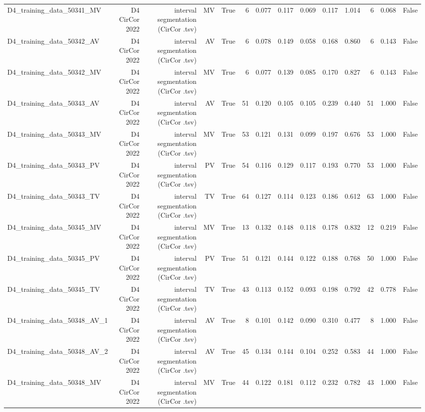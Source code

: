 \begin{table}[htbp]
\begin{tabular}{lrrrrrrrrrrrrr}
    D4\_training\_data\_50341\_MV & D4 CirCor 2022 & interval segmentation (CirCor .tsv) & MV & True & 6 & 0.077 & 0.117 & 0.069 & 0.117 & 1.014 & 6 & 0.068 & False \\
    D4\_training\_data\_50342\_AV & D4 CirCor 2022 & interval segmentation (CirCor .tsv) & AV & True & 6 & 0.078 & 0.149 & 0.058 & 0.168 & 0.860 & 6 & 0.143 & False \\
    D4\_training\_data\_50342\_MV & D4 CirCor 2022 & interval segmentation (CirCor .tsv) & MV & True & 6 & 0.077 & 0.139 & 0.085 & 0.170 & 0.827 & 6 & 0.143 & False \\
    D4\_training\_data\_50343\_AV & D4 CirCor 2022 & interval segmentation (CirCor .tsv) & AV & True & 51 & 0.120 & 0.105 & 0.105 & 0.239 & 0.440 & 51 & 1.000 & False \\
    D4\_training\_data\_50343\_MV & D4 CirCor 2022 & interval segmentation (CirCor .tsv) & MV & True & 53 & 0.121 & 0.131 & 0.099 & 0.197 & 0.676 & 53 & 1.000 & False \\
    D4\_training\_data\_50343\_PV & D4 CirCor 2022 & interval segmentation (CirCor .tsv) & PV & True & 54 & 0.116 & 0.129 & 0.117 & 0.193 & 0.770 & 53 & 1.000 & False \\
    D4\_training\_data\_50343\_TV & D4 CirCor 2022 & interval segmentation (CirCor .tsv) & TV & True & 64 & 0.127 & 0.114 & 0.123 & 0.186 & 0.612 & 63 & 1.000 & False \\
    D4\_training\_data\_50345\_MV & D4 CirCor 2022 & interval segmentation (CirCor .tsv) & MV & True & 13 & 0.132 & 0.148 & 0.118 & 0.178 & 0.832 & 12 & 0.219 & False \\
    D4\_training\_data\_50345\_PV & D4 CirCor 2022 & interval segmentation (CirCor .tsv) & PV & True & 51 & 0.121 & 0.144 & 0.122 & 0.188 & 0.768 & 50 & 1.000 & False \\
    D4\_training\_data\_50345\_TV & D4 CirCor 2022 & interval segmentation (CirCor .tsv) & TV & True & 43 & 0.113 & 0.152 & 0.093 & 0.198 & 0.792 & 42 & 0.778 & False \\
    D4\_training\_data\_50348\_AV\_1 & D4 CirCor 2022 & interval segmentation (CirCor .tsv) & AV & True & 8 & 0.101 & 0.142 & 0.090 & 0.310 & 0.477 & 8 & 1.000 & False \\
    D4\_training\_data\_50348\_AV\_2 & D4 CirCor 2022 & interval segmentation (CirCor .tsv) & AV & True & 45 & 0.134 & 0.144 & 0.104 & 0.252 & 0.583 & 44 & 1.000 & False \\
    D4\_training\_data\_50348\_MV & D4 CirCor 2022 & interval segmentation (CirCor .tsv) & MV & True & 44 & 0.122 & 0.181 & 0.112 & 0.232 & 0.782 & 43 & 1.000 & False \\

\end{tabular}
\end{table}
